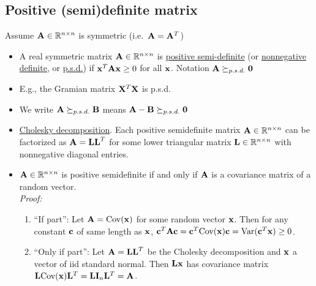 \subsection*{Positive (semi)definite matrix}
Assume $\mathbf{A} \in \mathbb{R}^{n \times n}$ is symmetric (i.e.~$\mathbf{A} = \mathbf{A}^T$)
\begin{itemize}
	\item A real symmetric matrix $\mathbf{A} \in \mathbb{R}^{n \times n}$ is \underline{positive semi-definite} (or \underline{nonnegative definite}, or \underline{p.s.d.}) if $\mathbf{x}^T\mathbf{A}\mathbf{x} \ge 0$ for all $\mathbf{x}$.
	Notation $\mathbf{A}\succeq_{p.s.d.} \mathbf{0}$
	\item E.g., the Gramian matrix $\mathbf{X}^T \mathbf{X}$ is p.s.d.
	\item We write  $\mathbf{A}\succeq_{p.s.d.} \mathbf{B}$ means  $\mathbf{A - B}\succeq_{p.s.d.} \mathbf{0}$
	\item \underline{Cholesky decomposition}.  Each positive semidefinite matrix $\mathbf{A} \in \mathbb{R}^{n \times n}$ can be factorized as $\mathbf{A} = \mathbf{LL}^T$ for some lower triangular matrix $\mathbf{L} \in \mathbb{R}^{n \times n}$ with nonnegative diagonal entries.
	\item $\mathbf{A} \in \mathbb{R}^{n \times n}$ is positive semidefinite if and only if $\mathbf{A}$ is a covariance matrix of a random vector.\\
	{\it Proof: }\\
	\begin{pf}
		\begin{enumerate}
			\item 	``If part'': Let $\mathbf{A} = \mbox{Cov}(\mathbf{x})$ for some random vector $\mathbf{x}$. Then for any constant $\mathbf{c}$ of same length as $\mathbf{x}$, $\mathbf{c}^T \mathbf{Ac} = \mathbf{c}^T \mbox{Cov}(\mathbf{x}) \mathbf{c} = \mbox{Var}(\mathbf{c}^T\mathbf{x}) \ge 0$.
			\item ``Only if part'': Let $\mathbf{A} = \mathbf{LL}^T$ be the Cholesky decomposition and $\mathbf{x}$ a vector of iid standard normal.  Then $\mathbf{Lx}$ has covariance matrix $\mathbf{L}\mbox{Cov}(\mathbf{x})\mathbf{L}^T  = \mathbf{L}\mathbf{I}_n \mathbf{L}^T = \mathbf{A}$.
		\end{enumerate}
	\end{pf}
\end{itemize}
























